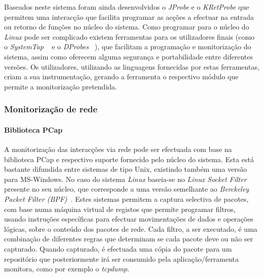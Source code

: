 \documentclass[a4paper]{llncs}
\newcommand{\td}[1]{\todo[inline]{#1}}
\begin{document}
 Baseados neste sistema foram ainda desenvolvidos o \textit{JProbe} e o \textit{KRetProbe} que permitem uma interacção que facilita programar as acções a efectuar na entrada ou retorno de funções no núcleo do sistema.
 Como programar para o núcleo do \textit{Linux} pode ser complicado existem ferramentas para os utilizadores finais (como o \textit{SystemTap} ~\cite{Jones2009} e o \textit{DProbes} ~\cite{:DProbes}),  que facilitam a programação e monitorização do sistema, assim como oferecem alguma segurança e portabilidade entre diferentes  versões. Os utilizadores, utilizando as linguagens fornecidas por estas ferramentas, criam a sua instrumentação, gerando a ferramenta o respectivo módulo que permite a monitorização pretendida.

\subsubsection{Monitorização de rede}
\label{subsub:mon_network__with_dynamic_filters_linux}

%
%
%
%

\paragraph{Biblioteca PCap\\}

A monitorização das interacções via rede pode ser efectuada com base na biblioteca PCap e respectivo suporte fornecido pelo núcleo do sistema.
 Esta está bastante difundida entre sistemas de tipo Unix, existindo também uma versão para MS-Windows.
No caso do sistema \textit{Linux} baseia-se no \textit{Linux Socket Filter} presente no seu núcleo, que corresponde a uma versão semelhante ao \textit{Berckeley Packet Filter (BPF)}~\cite{Mccanne92thebsd}.
 Estes sistemas permitem a captura selectiva de pacotes, com base numa máquina virtual de registos que permite programar filtros, usando instruções específicas para efectuar movimentações de dados e operações lógicas, sobre o conteúdo dos pacotes de rede.
 Cada filtro, a ser executado, é uma combinação de diferentes regras que determinam se cada pacote deve ou não ser capturado.
 Quando capturado, é efectuada uma cópia do pacote para um repositório que posteriormente irá ser consumido pela aplicação/ferramenta monitora, como por exemplo o \textit{tcpdump}.
\end{document}
